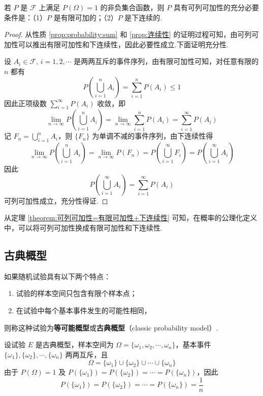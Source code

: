 \begin{theorem}[][][theorem:可列可加性=有限可加性+下连续性]
    \indent 若 $P$ 是 $\mathcal{F}$ 上满足 $P(\varOmega) = 1$ 的非负集合函数，则 $P$ 具有可列可加性的充分必要条件是：（1）$P$ 是有限可加的；（2）$P$ 是下连续的.
\end{theorem}

\begin{proof}
    从性质 \ref{prop:probability:sum} 和 \ref{prop:连续性} 的证明过程可知，由可列可加性可以推出有限可加性和下连续性，因此必要性成立.下面证明充分性.

    设 $A_i \in \mathcal{F}, \, i=1,2,\cdots$ 是两两互斥的事件序列，由有限可加性可知，对任意有限的 $n$ 都有
    $$
    P \left( \bigcup_{i=1}^n A_i \right) = \sum_{i=1}^n P(A_i) \leqslant 1
    $$
    因此正项级数 $\displaystyle\sum_{i=1}^{\infty} P(A_i)$ 收敛，即
    $$
    \lim_{n \to \infty} P \left( \bigcup_{i=1}^n A_i \right) = \lim_{n \to \infty} \sum_{i=1}^n P(A_i) = \sum_{i=1}^{\infty} P(A_i)
    $$
    记 $F_n = \displaystyle\bigcup_{i=1}^n A_i$，则 $\{ F_n \}$ 为单调不减的事件序列，由下连续性得
    $$
    \lim_{n \to \infty} P \left( \bigcup_{i=1}^n A_i \right) = \lim_{n \to \infty} P(F_n) = P \left(  \bigcup_{i=1}^{\infty} F_i \right) = P \left( \bigcup_{i=1}^{\infty} A_i \right)
    $$
    因此
    $$
    P \left( \bigcup_{i=1}^{\infty} A_i \right) = \sum_{i=1}^{\infty} P(A_i)
    $$
    可列可加性成立，充分性得证.
\end{proof}

\begin{note}
    \indent 从定理 \ref{theorem:可列可加性=有限可加性+下连续性} 可知，在概率的公理化定义中，可以将可列可加性换成有限可加性和下连续性.
\end{note}

\subsection{古典概型}

如果随机试验具有以下两个特点：
\begin{enumerate}
    \item 试验的样本空间只包含有限个样本点；
    \item 在试验中每个基本事件发生的可能性相同，
\end{enumerate}
则称这种试验为\textbf{等可能概型}或\textbf{古典概型}（classic probability model）.

设试验 $E$ 是古典概型，样本空间为 $\varOmega = \{\omega_1,\omega_2,\cdots,\omega_n\}$，基本事件 $\{\omega_1\},\{\omega_2\},\cdots,\{\omega_n\}$ 两两互斥，且
$$
\varOmega = \{\omega_1\} \cup \{\omega_2\} \cup \cdots \cup \{\omega_n\}
$$
由于 $P(\varOmega)=1$ 及 $P(\{\omega_1\})=P(\{\omega_2\})=\cdots=P(\{\omega_n\})$，因此
$$
P(\{\omega_1\})=P(\{\omega_2\})=\cdots=P(\{\omega_n\})=\dfrac{1}{n}
$$


